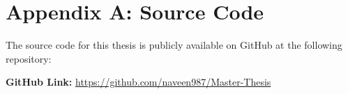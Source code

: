\appendix
\renewcommand{\thechapter}{A}
\chapter*{Appendix A: Source Code}
\label{AppendixA}

\vspace{1em}
\noindent The source code for this thesis is publicly available on GitHub at the following repository:

\vspace{1em}
\noindent\textbf{GitHub Link:} \href{https://github.com/naveen987/Master-Thesis}{https://github.com/naveen987/Master-Thesis}
